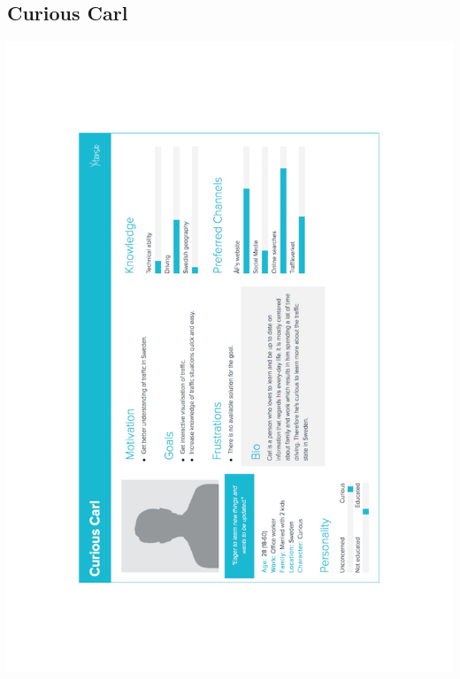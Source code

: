 \documentclass[12pt]{kththesis}
\begin{document}
\begin{appendices}
\subsection{Curious Carl}
\includegraphics[width=1\textwidth]{CuriousCarl}


\end{appendices}
\end{document}
